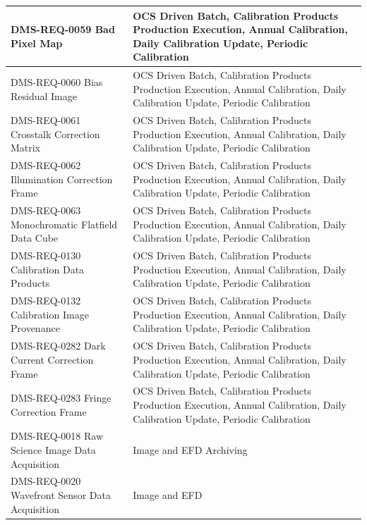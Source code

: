 \documentclass[DM,lsstdraft,toc]{lsstdoc}
\begin{document}
\begin{xtabular}{|p{0.4\textwidth}|p{0.55\textwidth}|}
DMS-REQ-0059 Bad Pixel Map & OCS Driven Batch, Calibration Products
Production Execution, Annual Calibration, Daily Calibration Update,
Periodic Calibration\\ \hline
DMS-REQ-0060 Bias Residual Image & OCS Driven Batch, Calibration
Products Production Execution, Annual Calibration, Daily Calibration
Update, Periodic Calibration\\ \hline
DMS-REQ-0061 Crosstalk Correction Matrix & OCS Driven Batch, Calibration
Products Production Execution, Annual Calibration, Daily Calibration
Update, Periodic Calibration\\ \hline
DMS-REQ-0062 Illumination Correction Frame & OCS Driven Batch,
Calibration Products Production Execution, Annual Calibration, Daily
Calibration Update, Periodic Calibration\\ \hline
DMS-REQ-0063 Monochromatic Flatfield Data Cube & OCS Driven Batch,
Calibration Products Production Execution, Annual Calibration, Daily
Calibration Update, Periodic Calibration\\ \hline
DMS-REQ-0130 Calibration Data Products & OCS Driven Batch, Calibration
Products Production Execution, Annual Calibration, Daily Calibration
Update, Periodic Calibration\\ \hline
DMS-REQ-0132 Calibration Image Provenance & OCS Driven Batch,
Calibration Products Production Execution, Annual Calibration, Daily
Calibration Update, Periodic Calibration\\ \hline
DMS-REQ-0282 Dark Current Correction Frame & OCS Driven Batch,
Calibration Products Production Execution, Annual Calibration, Daily
Calibration Update, Periodic Calibration\\ \hline
DMS-REQ-0283 Fringe Correction Frame & OCS Driven Batch, Calibration
Products Production Execution, Annual Calibration, Daily Calibration
Update, Periodic Calibration\\ \hline
DMS-REQ-0018 Raw Science Image Data Acquisition & Image and EFD
Archiving\\ \hline
DMS-REQ-0020 Wavefront Sensor Data Acquisition & Image and EFD

\end{xtabular}
\end{document}
